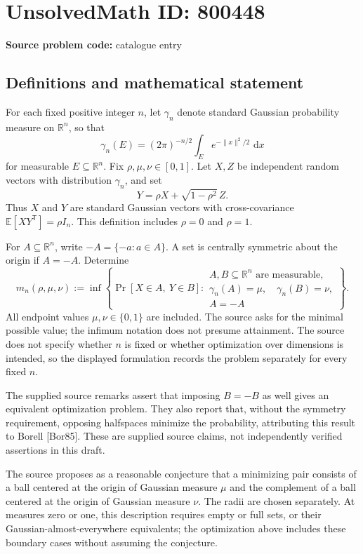 \documentclass[11pt]{article}
\newcommand{\R}{\mathbb{R}}
\newcommand{\E}{\mathbb{E}}
\newcommand{\dd}{\,\mathrm{d}}
\begin{document}
\section*{UnsolvedMath ID: 800448}
\textbf{Source problem code:} catalogue entry
\subsection{Definitions and mathematical statement}
For each fixed positive integer \(n\), let \(\gamma_n\) denote standard Gaussian probability measure on \(\R^n\), so that
\[
\gamma_n(E)=(2\pi)^{-n/2}\int_E e^{-\|x\|^2/2}\,\dd x
\]
for measurable \(E\subseteq\R^n\). Fix \(\rho,\mu,\nu\in[0,1]\). Let \(X,Z\) be independent random vectors with distribution \(\gamma_n\), and set
\[
Y=\rho X+\sqrt{1-\rho^2}\,Z.
\]
Thus \(X\) and \(Y\) are standard Gaussian vectors with cross-covariance \(\E[XY^{\mathsf T}]=\rho I_n\). This definition includes \(\rho=0\) and \(\rho=1\).

For \(A\subseteq\R^n\), write \(-A=\{-a:a\in A\}\). A set is centrally symmetric about the origin if \(A=-A\). Determine
\[
m_n(\rho,\mu,\nu)
:=\inf\left\{
\Pr[X\in A,\ Y\in B]:
\begin{array}{l}
A,B\subseteq\R^n\text{ are measurable},\\
\gamma_n(A)=\mu,\quad\gamma_n(B)=\nu,\\
A=-A
\end{array}
\right\}.
\]
All endpoint values \(\mu,\nu\in\{0,1\}\) are included. The source asks for the minimal possible value; the infimum notation does not presume attainment. The source does not specify whether \(n\) is fixed or whether optimization over dimensions is intended, so the displayed formulation records the problem separately for every fixed \(n\).

The supplied source remarks assert that imposing \(B=-B\) as well gives an equivalent optimization problem. They also report that, without the symmetry requirement, opposing halfspaces minimize the probability, attributing this result to Borell [Bor85]. These are supplied source claims, not independently verified assertions in this draft.

The source proposes as a reasonable conjecture that a minimizing pair consists of a ball centered at the origin of Gaussian measure \(\mu\) and the complement of a ball centered at the origin of Gaussian measure \(\nu\). The radii are chosen separately. At measures zero or one, this description requires empty or full sets, or their Gaussian-almost-everywhere equivalents; the optimization above includes these boundary cases without assuming the conjecture.
\end{document}
